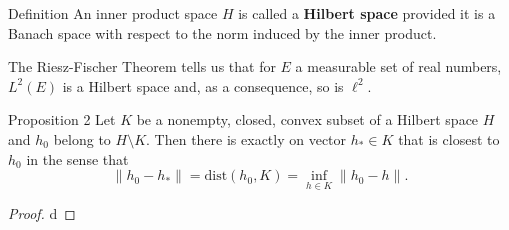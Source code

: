 \begin{namedthm*}{Definition}
    An inner product space $H$ is called a \textbf{Hilbert space} provided it is a Banach space with respect to the norm induced by the inner product.
\end{namedthm*}
The Riesz-Fischer Theorem tells us that for $E$ a measurable set of real numbers, $L^2(E)$ is a Hilbert space and, as a consequence, so is $\ell^2$.
\begin{namedthm*}{Proposition 2}
    Let $K$ be a nonempty, closed, convex subset of a Hilbert space $H$ and $h_0$ belong to $H\setminus K$.
    Then there is exactly on vector $h_*\in K$ that is closest to $h_0$ in the sense that
    \[
        \|h_0-h_*\|=\text{dist}(h_0,K)=\underset{h\in K}{\inf}\|h_0-h\|.
    \]
\end{namedthm*}
\begin{proof}
    d
\end{proof}


